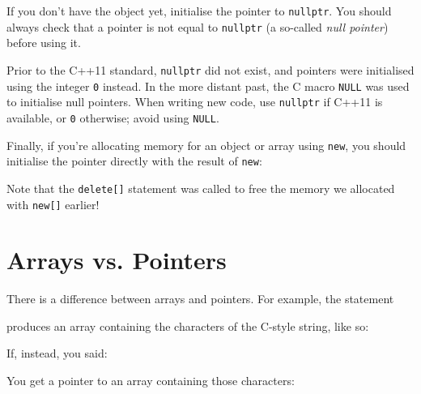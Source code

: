 \documentclass[a4paper]{scrartcl}
\begin{document}


If you don't have the object yet, initialise the pointer to \verb|nullptr|. You should always check that a pointer is not equal to \verb|nullptr| (a so-called \emph{null pointer}) before using it.



Prior to the C++11 standard, \verb|nullptr| did not exist, and pointers were initialised using the integer \verb|0| instead. In the more distant past, the C macro \verb|NULL| was used to initialise null pointers. When writing new code, use \verb|nullptr| if C++11 is available, or \verb|0| otherwise; avoid using \verb|NULL|.

Finally, if you're allocating memory for an object or array using \texttt{new}, you should initialise the pointer directly with the result of \texttt{new}:



Note that the \verb|delete[]| statement was called to free the memory we allocated with \verb|new[]| earlier!

\section{Arrays vs. Pointers}
There is a difference between arrays and pointers. For example, the statement



produces an array containing the characters of the C-style string, like so:


If, instead, you said:



You get a pointer to an array containing those characters:

\end{document}
